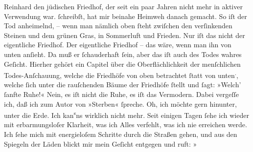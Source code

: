 \begin{ledgroupsized}[t]{13cm}
{{{                     Reinhard den jüdischen Friedhof, der
                  seit ein paar Jahren nicht mehr in aktiver Verwendung war.}}}\label{K_L02739-2h} ſchreibſt, hat
               mir beinahe Heimweh danach gemacht. So iſt der Tod anheimelnd, – wenn man nämlich
               oben ſteht zwiſchen den verſinkenden Steinen und dem grünen Gras, in Sommerluft und
               Frieden. Nur iſt das nicht der eigentliche Friedhof. Der eigentliche {\pb}Friedhof – das wäre, wenn man ihn von unten anſieht.
               Da muß er ſchauderhaft ſein, aber das  iſt auch des Todes wahres Geſicht. Hierher gehört ein Capitel über die
               Oberflächlichkeit der menſchlichen Todes-Anſchauung, welche die Friedhöfe von oben
               betrachtet ſtatt von unten\substVorne{}\textsuperscript{.}\substDazwischen{},\substHinten{} welche ſich unter die  rauſchenden Bäume der Friedhöfe ſtellt und ſagt: {\pb}»Welch’ ſanfte Ruhe!« Nein, es iſt nicht die Ruhe,
               es iſt das Vermodern. \pend
           \pstart
           Dabei vergeſſe ich, daß ich zum Autor von »Sterben« ſpreche.\pend
           \pstart
            Oh, ich möchte gern  hinunter, unter die Erde. Ich kan\substVorne{}\textsuperscript{s}\substDazwischen{}ns\substHinten{} wirklich nicht mehr. Seit einigen Tagen ſehe ich wieder mit erbarmungsloſer
               Klarheit, was ich Alles verfehlt, was {\pb}ich nie
               erreichen werde. Ich ſehe mich mit energieloſem Schritte durch die Straßen gehen, und
               aus den Spiegeln der Läden blickt mir mein Geſicht entgegen und ruft: »\label{K_L02739-3v}
\end{ledgroupsized}

